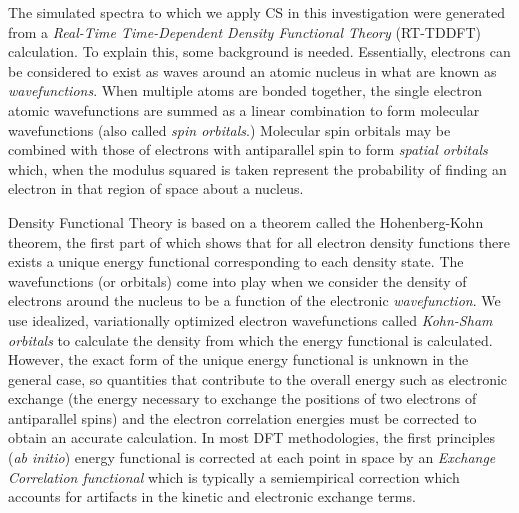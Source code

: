 \documentclass[11pt]{article}
\begin{document}
\par The simulated spectra to which we apply CS in this investigation were generated from a \emph{Real-Time Time-Dependent Density Functional Theory} (RT-TDDFT) calculation. To explain this, some background is needed. Essentially, electrons can be considered to exist as waves around an atomic nucleus in what are known as \emph{wavefunctions}.  When multiple atoms are bonded together, the single electron atomic wavefunctions are summed as a linear combination to form molecular wavefunctions (also called \emph{spin orbitals}.) Molecular spin orbitals may be combined with those of electrons with antiparallel spin to form \emph{spatial orbitals} which, when the modulus squared is taken represent the probability of finding an electron in that region of space about a nucleus.\\

\par Density Functional Theory is based on a theorem called the Hohenberg-Kohn theorem, the first part of which shows that for all electron density functions there exists a unique energy functional corresponding to each density state.  The wavefunctions (or orbitals) come into play when we consider the density of electrons around the nucleus to be a function of the electronic \emph{wavefunction}.  We use idealized, variationally optimized electron wavefunctions called \emph{Kohn-Sham orbitals} to calculate the density from which the energy functional is calculated. However, the exact form of the unique energy functional is unknown in the general case, so quantities that contribute to the overall energy such as electronic exchange (the energy necessary to exchange the positions of two electrons of antiparallel spins) and the electron correlation energies must be corrected to obtain an accurate calculation.  In most DFT methodologies, the first principles (\emph{ab initio}) energy functional is corrected at each point in space by an \emph{Exchange Correlation functional} which is typically a semiempirical correction which accounts for artifacts in the kinetic and electronic exchange terms.\\
\end{document}
